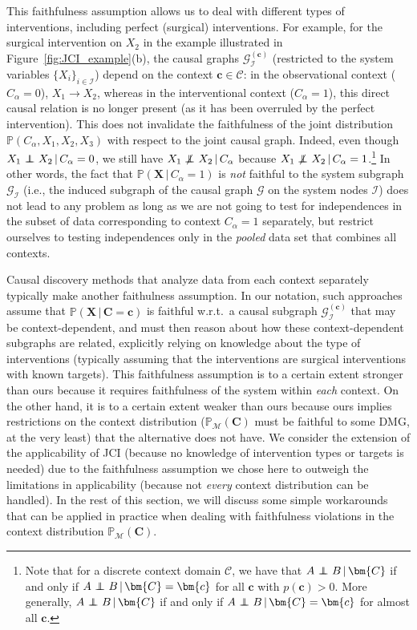 \documentclass[twoside,11pt]{article}
\DeclareMathOperator*{\CI}{{\,\perp\mkern-12mu\perp\,}}
\DeclareMathOperator*{\nCI}{{\,\not\mkern-1mu\perp\mkern-12mu\perp\,}}
\newcommand{\Prb}{\mathbb{P}}
\newcommand\B[1]{\bm{#1}}
\newcommand\C[1]{\mathcal{#1}}
\newcommand\BC[1]{\bm{\mathcal{#1}}}
\newcommand\given{\,|\,}
\begin{document}
This faithfulness assumption allows us to deal with different types of
interventions, including perfect (surgical) interventions.  For example, for
the surgical intervention on $X_2$ in the example illustrated in
Figure~\ref{fig:JCI_example}(b), the causal graphs $\C{G}_{\C{I}}^{(\B{c})}$
(restricted to the system variables $\{X_i\}_{i\in\C{I}}$) depend on the context
$\B{c}\in\BC{C}$: in the observational
context ($C_\alpha=0$), $X_1\to X_2$, whereas in the interventional context
($C_\alpha=1$), this direct causal relation is no longer present (as it has been
overruled by the perfect intervention). This does not invalidate the
faithfulness of the joint distribution $\Prb(C_\alpha,X_1,X_2,X_3)$ with respect to
the joint causal graph. Indeed, even though $X_1 \CI X_2 \given C_\alpha=0$, we
still have $X_1 \nCI X_2 \given C_\alpha$ because $X_1 \nCI X_2 \given
C_\alpha=1$.\footnote{Note that for a discrete context domain $\BC{C}$, we have that
$A \CI B \given \B{C}$ if and only if $A \CI B \given \B{C}=\B{c}$ for all
$\B{c}$ with $p(\B{c}) > 0$. More generally, $A \CI B \given \B{C}$ if and only if
$A \CI B \given \B{C}=\B{c}$ for almost all $\B{c}$.} In other words, the fact that $\Prb(\B{X} \given
C_\alpha=1)$ is \emph{not} faithful to the system subgraph $\C{G}_{\C{I}}$ (i.e.,
the induced subgraph of the causal graph $\C{G}$ on the system nodes $\C{I}$)
does not lead to any problem as long as we are not going to test for
independences in the subset of data corresponding to context $C_\alpha=1$ separately, but restrict
ourselves to testing independences only in the \emph{pooled} data set that combines all 
contexts.

Causal discovery methods that analyze data from each context separately \citep[e.g.,][]{GIES2012,triantafillou2015constraint,HEJ2014} typically make another faithulness assumption.
In our notation, such approaches assume that $\Prb(\B{X} \given \B{C}=\B{c})$ is faithful w.r.t.\ a causal subgraph $\C{G}_{\C{I}}^{(\B{c})}$ that may be context-dependent, and must then reason about how these context-dependent subgraphs are related, explicitly relying on knowledge about the type of interventions (typically assuming that the interventions are surgical interventions with known targets).
This faithfulness assumption is to a certain extent stronger than ours because it requires faithfulness of the system within \emph{each} context.
On the other hand, it is to a certain extent weaker than ours because ours implies restrictions on the context distribution ($\Prb_{\C{M}}(\B{C})$ must be faithful to some DMG, at the very least) that the alternative does not have.
We consider the extension of the applicability of JCI (because no knowledge of intervention types or targets is needed) due to the faithfulness assumption we chose here to outweigh the limitations in applicability (because not \emph{every} context distribution can be handled). In the rest of this section, we will discuss some simple workarounds that can be applied in practice when dealing with faithfulness violations in the context distribution $\Prb_{\C{M}}(\B{C})$.
\end{document}
